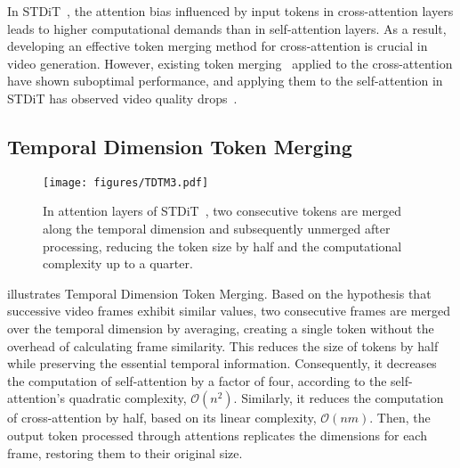 In STDiT~\cite{opensora}, the attention bias influenced by input tokens in cross-attention layers leads to higher computational demands than in self-attention layers.
As a result, developing an effective token merging method for cross-attention is crucial in video generation. However, existing token merging~\cite{bolya2022token, bolya2023token, li2024vidtome} applied to the cross-attention have shown suboptimal performance, and applying them to the self-attention in STDiT has observed video quality drops~\cite{bolya2022token,bolya2023token}.


\subsection{Temporal Dimension Token Merging}

\begin{figure}[!t]
    \centering
    \texttt{[image: figures/TDTM3.pdf]}
    \caption{In attention layers of STDiT~\cite{opensora}, two consecutive tokens are merged along the temporal dimension and subsequently unmerged after processing, reducing the token size by half and the computational complexity up to a quarter.}
    \label{fig:TDTM-fig}
\end{figure}

 illustrates Temporal Dimension Token Merging. Based on the hypothesis that successive video frames exhibit similar values, two consecutive frames are merged over the temporal dimension by averaging, creating a single token without the overhead of calculating frame similarity. This reduces the size of tokens by half while preserving the essential temporal information. Consequently, it decreases the computation of self-attention by a factor of four, according to the self-attention's quadratic complexity, $\mathcal{O}(n^{2})$. Similarly, it reduces the computation of cross-attention by half, based on its linear complexity, $\mathcal{O}(n m)$. Then, the output token processed through attentions replicates the dimensions for each frame, restoring them to their original size. %

